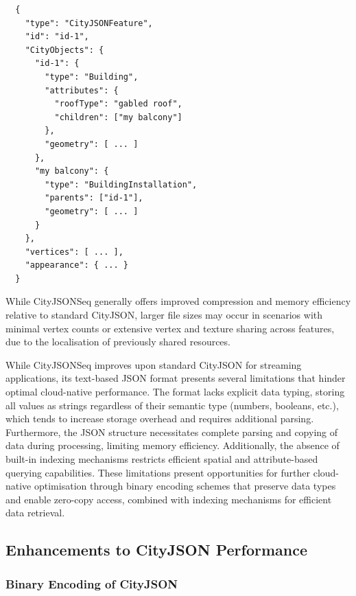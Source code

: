 \begin{lstlisting}
  {
    "type": "CityJSONFeature",
    "id": "id-1",
    "CityObjects": {
      "id-1": {
        "type": "Building",
        "attributes": {
          "roofType": "gabled roof",
          "children": ["my balcony"]
        },
        "geometry": [ ... ]
      },
      "my balcony": {
        "type": "BuildingInstallation",
        "parents": ["id-1"],
        "geometry": [ ... ]
      }
    },
    "vertices": [ ... ],
    "appearance": { ... }
  }
\end{lstlisting}

While CityJSONSeq generally offers improved compression and memory efficiency relative to standard CityJSON, larger file sizes may occur in scenarios with minimal vertex counts or extensive vertex and texture sharing across features, due to the localisation of previously shared resources.

While CityJSONSeq improves upon standard CityJSON for streaming applications, its text-based JSON format presents several limitations that hinder optimal cloud-native performance. The format lacks explicit data typing, storing all values as strings regardless of their semantic type (numbers, booleans, etc.), which tends to increase storage overhead and requires additional parsing. Furthermore, the JSON structure necessitates complete parsing and copying of data during processing, limiting memory efficiency. Additionally, the absence of built-in indexing mechanisms restricts efficient spatial and attribute-based querying capabilities. These limitations present opportunities for further cloud-native optimisation through binary encoding schemes that preserve data types and enable zero-copy access, combined with indexing mechanisms for efficient data retrieval.

\subsection{Enhancements to CityJSON Performance}
\label{rw:cityjson_enhancements:performance}

\subsubsection{Binary Encoding of CityJSON}
\label{rw:cityjson_enhancements:performance:binary_encoding}

